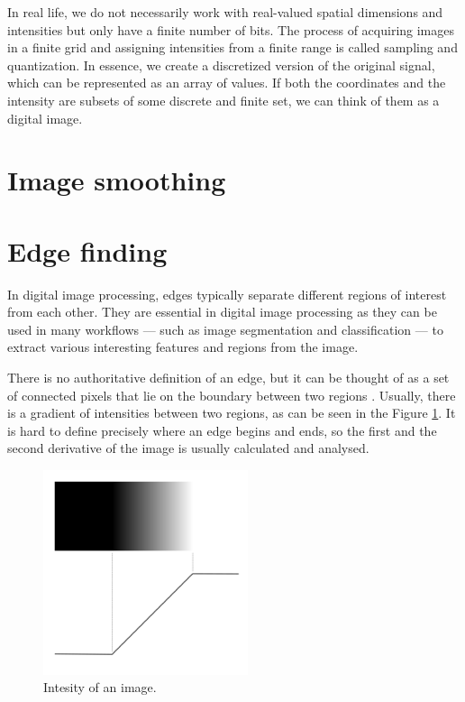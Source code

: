 \documentclass[
  digital,     %
  oneside,     %
  nosansbold,  %
  nocolorbold, %
  lof,         %
  lot,         %
]{fithesis4}
\begin{document}
In real life, we do not necessarily work with real-valued spatial dimensions and
intensities but only have a finite number of bits. The process of
acquiring images in a finite grid and assigning intensities from a finite
range is called sampling and quantization. In essence, we create a discretized
version of the original signal, which can be represented as an array of values.
If both the coordinates and the intensity are subsets of some discrete and finite set,
we can think of them as a digital image.

\section{Image smoothing}

\section{Edge finding}

In digital image processing, edges typically separate different regions of
interest from each other. They are essential in digital image processing
as they can be used in many workflows --- such as image segmentation and
classification --- to extract various interesting features and regions
from the image.

There is no authoritative definition of an edge, but it can be thought of as a
set of connected pixels that lie on the boundary between two regions
\parencite{gonzalez2002}. Usually, there is a gradient of intensities between two
regions, as can be seen in the Figure \ref{fig:edge_intensities}. It is hard to
define precisely where an edge begins and ends, so the first and the second
derivative of the image is usually calculated and analysed.


\begin{figure}
    \begin{center}
        \includegraphics[width=6cm]{resources/inkscape/gradient.png}
    \end{center}
    \caption{Intesity of an image.}
    \label{fig:edge_intensities}
\end{figure}
\end{document}
